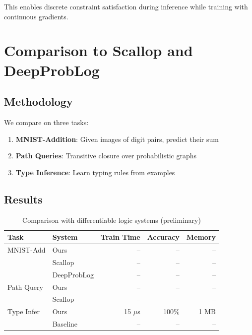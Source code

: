\documentclass[11pt,a4paper]{article}
\begin{document}
This enables discrete constraint satisfaction during inference while training with continuous gradients.

\section{Comparison to Scallop and DeepProbLog}
\label{sec:comparison_chirho}

\subsection{Methodology}
\label{subsec:comparison_method_chirho}

We compare on three tasks:
\begin{enumerate}
  \item \textbf{MNIST-Addition}: Given images of digit pairs, predict their sum
  \item \textbf{Path Queries}: Transitive closure over probabilistic graphs
  \item \textbf{Type Inference}: Learn typing rules from examples
\end{enumerate}

\subsection{Results}
\label{subsec:comparison_results_chirho}

\begin{table}[ht]
\centering
\caption{Comparison with differentiable logic systems (preliminary)}
\label{tab:comparison_chirho}
\begin{tabular}{llrrr}
\toprule
\textbf{Task} & \textbf{System} & \textbf{Train Time} & \textbf{Accuracy} & \textbf{Memory} \\
\midrule
MNIST-Add & Ours & -- & -- & -- \\
          & Scallop & -- & -- & -- \\
          & DeepProbLog & -- & -- & -- \\
\midrule
Path Query & Ours & -- & -- & -- \\
           & Scallop & -- & -- & -- \\
\midrule
Type Infer & Ours & 15 $\mu$s & 100\% & 1 MB \\
           & Baseline & -- & -- & -- \\
\bottomrule
\end{tabular}
\end{table}
\end{document}
